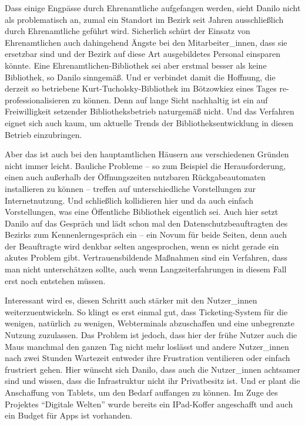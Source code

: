 \documentclass[a4paper,
fontsize=11pt,
oneside,
numbers=noperiodatend,
parskip=half-,
bibliography=totoc,
final
]{scrartcl}
\begin{document}
Dass einige Engpässe durch Ehrenamtliche aufgefangen werden, sieht
Danilo nicht als problematisch an, zumal ein Standort im Bezirk seit
Jahren ausschließlich durch Ehrenamtliche geführt wird. Sicherlich
schürt der Einsatz von Ehrenamtlichen auch dahingehend Ängste bei den
Mitarbeiter\_innen, dass sie ersetzbar sind und der Bezirk auf diese Art
ausgebildetes Personal einsparen könnte. Eine Ehrenamtlichen-Bibliothek
sei aber erstmal besser als keine Bibliothek, so Danilo sinngemäß. Und
er verbindet damit die Hoffnung, die derzeit so betriebene
Kurt-Tucholsky-Bibliothek im Bötzowkiez eines Tages
re-professionalisieren zu können. Denn auf lange Sicht nachhaltig ist
ein auf Freiwilligkeit setzender Bibliotheksbetrieb naturgemäß nicht.
Und das Verfahren eignet sich auch kaum, um aktuelle Trends der
Bibliotheksentwicklung in diesen Betrieb einzubringen.

Aber das ist auch bei den hauptamtlichen Häusern aus verschiedenen
Gründen nicht immer leicht. Bauliche Probleme -- so zum Beispiel die
Herausforderung, einen auch außerhalb der Öffnungszeiten nutzbaren
Rückgabeautomaten installieren zu können -- treffen auf unterschiedliche
Vorstellungen zur Internetnutzung. Und schließlich kollidieren hier und
da auch einfach Vorstellungen, was eine Öffentliche Bibliothek
eigentlich sei. Auch hier setzt Danilo auf das Gespräch und lädt schon
mal den Datenschutzbeauftragten des Bezirks zum Kennenlerngespräch ein
-- ein Novum für beide Seiten, denn auch der Beauftragte wird denkbar
selten angesprochen, wenn es nicht gerade ein akutes Problem gibt.
Vertrauensbildende Maßnahmen sind ein Verfahren, dass man nicht
unterschätzen sollte, auch wenn Langzeiterfahrungen in diesem Fall erst
noch entstehen müssen.

Interessant wird es, diesen Schritt auch stärker mit den Nutzer\_innen
weiterzuentwickeln. So klingt es erst einmal gut, dass Ticketing-System
für die wenigen, natürlich \emph{zu} wenigen, Webterminals abzuschaffen
und eine unbegrenzte Nutzung zuzulassen. Das Problem ist jedoch, dass
hier der frühe Nutzer auch die Maus manchmal den ganzen Tag nicht mehr
loslässt und andere Nutzer\_innen nach zwei Stunden Wartezeit entweder
ihre Frustration ventilieren oder einfach frustriert gehen. Hier wünscht
sich Danilo, dass auch die Nutzer\_innen achtsamer sind und wissen, dass
die Infrastruktur nicht ihr Privatbesitz ist. Und er plant die
Anschaffung von Tablets, um den Bedarf auffangen zu können. Im Zuge des
Projektes \enquote{Digitale Welten} wurde bereits ein IPad-Koffer
angeschafft und auch ein Budget für Apps ist vorhanden.
\end{document}
